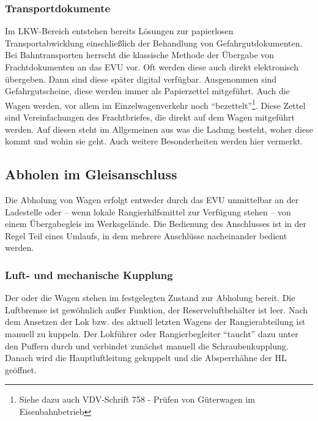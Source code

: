 \subsubsection{Transportdokumente}\label{sec:Transdoc}
Im LKW-Bereich entstehen bereits Lösungen zur papierlosen Transportabwicklung einschließlich der Behandlung von Gefahrgutdokumenten. Bei Bahntransporten herrscht die klassische Methode der Übergabe von Frachtdokumenten an das \acrshort{EVU} vor. Oft werden diese auch direkt elektronisch übergeben. Dann sind diese später digital verfügbar. Ausgenommen sind Gefahrgutscheine, diese werden immer als Papierzettel mitgeführt. Auch die Wagen werden, vor allem im Einzelwagenverkehr noch "`bezettelt"'\footnote{Siehe dazu auch VDV-Schrift 758 - Prüfen von Güterwagen im Eisenbahnbetrieb}. Diese Zettel sind Vereinfachungen des Frachtbriefes, die direkt auf dem Wagen mitgeführt werden. Auf diesen steht im Allgemeinen aus was die Ladung besteht, woher diese kommt und wohin sie geht. Auch weitere Besonderheiten werden hier vermerkt.
\subsection{Abholen im Gleisanschluss}
Die Abholung von Wagen erfolgt entweder durch das \acrshort{EVU} unmittelbar an der Ladestelle oder -- wenn lokale Rangierhilfsmittel zur Verfügung stehen -- von einem Übergabegleis im Werksgelände. Die Bedienung des Anschlusses ist in der Regel Teil eines Umlaufs, in dem mehrere Anschlüsse nacheinander bedient werden.
\subsubsection{Luft- und mechanische Kupplung}\label{sec:LuftumechKup}
Der oder die Wagen stehen im festgelegten Zustand zur Abholung bereit. Die Luftbremse ist gewöhnlich außer Funktion, der Reserveluftbehälter ist leer. Nach dem Ansetzen der Lok bzw. des aktuell letzten Wagens der Rangierabteilung ist manuell zu kuppeln. Der Lokführer oder Rangierbegleiter "`taucht"' dazu unter den Puffern durch und verbindet zunächst manuell die Schraubenkupplung. Danach wird die Hauptluftleitung gekuppelt und die Absperrhähne der \acrshort{HL} geöffnet. %
